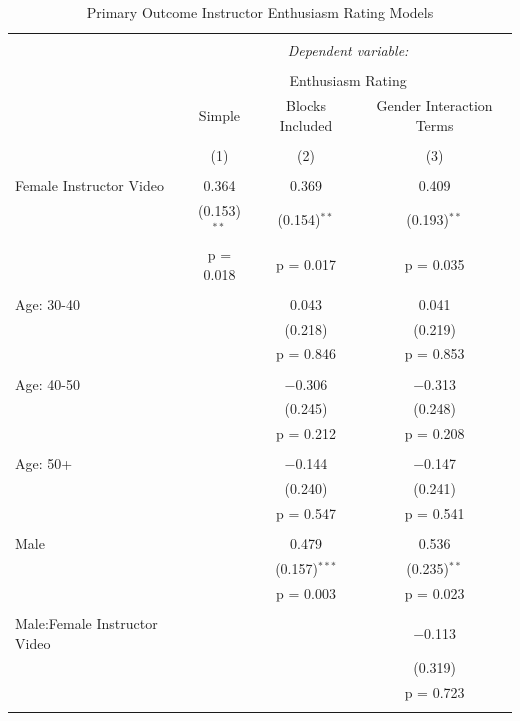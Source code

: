 \documentclass[
]{article}
\begin{document}
\clearpage

\begin{table}[!htbp] \centering 
  \caption{Primary Outcome Instructor Enthusiasm Rating Models} 
  \label{} 
\small 
\begin{tabular}{@{\extracolsep{3pt}}lccc} 
\\[-1.8ex]\hline 
\hline \\[-1.8ex] 
 & \multicolumn{3}{c}{\textit{Dependent variable:}} \\ 
\cline{2-4} 
\\[-1.8ex] & \multicolumn{3}{c}{Enthusiasm Rating} \\ 
 & Simple & Blocks Included & Gender Interaction Terms \\ 
\\[-1.8ex] & (1) & (2) & (3)\\ 
\hline \\[-1.8ex] 
 Female Instructor Video & 0.364 & 0.369 & 0.409 \\ 
  & (0.153)$^{**}$ & (0.154)$^{**}$ & (0.193)$^{**}$ \\ 
  & p = 0.018 & p = 0.017 & p = 0.035 \\ 
  & & & \\ 
 Age: 30-40 &  & 0.043 & 0.041 \\ 
  &  & (0.218) & (0.219) \\ 
  &  & p = 0.846 & p = 0.853 \\ 
  & & & \\ 
 Age: 40-50 &  & $-$0.306 & $-$0.313 \\ 
  &  & (0.245) & (0.248) \\ 
  &  & p = 0.212 & p = 0.208 \\ 
  & & & \\ 
 Age: 50+ &  & $-$0.144 & $-$0.147 \\ 
  &  & (0.240) & (0.241) \\ 
  &  & p = 0.547 & p = 0.541 \\ 
  & & & \\ 
 Male &  & 0.479 & 0.536 \\ 
  &  & (0.157)$^{***}$ & (0.235)$^{**}$ \\ 
  &  & p = 0.003 & p = 0.023 \\ 
  & & & \\ 
 Male:Female Instructor Video &  &  & $-$0.113 \\ 
  &  &  & (0.319) \\ 
  &  &  & p = 0.723 \\ 
  & & & \\ 

\end{tabular}
\end{table}
\end{document}
